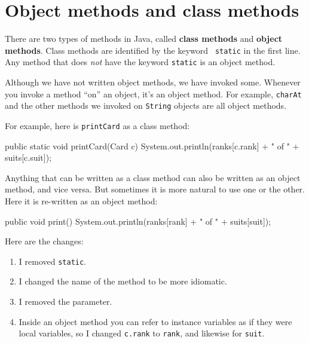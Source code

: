 \section{Object methods and class methods}


There are two types of methods in Java, called {\bf class methods} and
{\bf object methods}.  Class methods are identified by the keyword {\tt
  static} in the first line.  Any method that does {\em not} have the
keyword {\tt static} is an object method.

Although we have not written object methods, we have invoked some.
Whenever you invoke a method ``on'' an object, it's an object method.
For example, {\tt charAt} and the other methods we invoked on {\tt String}
objects are all object methods.

For example, here is {\tt printCard} as a class method:

\begin{code}
public static void printCard(Card c) {
    System.out.println(ranks[c.rank] + " of " + suits[c.suit]);
}
\end{code}

Anything that can be written as a class method can also be written as an
object method, and vice versa.  But sometimes it is more natural to
use one or the other.
Here it is re-written as an object method:

\begin{code}
public void print() {
    System.out.println(ranks[rank] + " of " + suits[suit]);
}
\end{code}

Here are the changes:

\begin{enumerate}

\item I removed {\tt static}.

\item I changed the name of the method to be more idiomatic.

\item I removed the parameter.

\item Inside an object method you can refer to instance variables
as if they were local variables, so I changed {\tt c.rank} to {\tt rank},
and likewise for {\tt suit}.

\end{enumerate}

